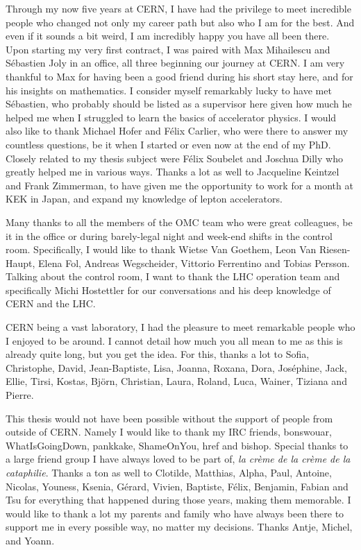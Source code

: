 Through my now five years at CERN, I have had the privilege to meet incredible people who changed
not only my career path but also who I am for the best. And even if it sounds a bit weird, I am
incredibly happy you have all been there.\\
\indent
Upon starting my very first contract, I was paired with Max Mihailescu and Sébastien Joly in an
office, all three beginning our journey at CERN. I am very thankful to Max for having been a good
friend during his short stay here, and for his insights on mathematics. I consider myself
remarkably lucky to have met Sébastien, who probably should be listed as a supervisor here given how 
much he helped me when I struggled to learn the basics of accelerator physics.
I would also like to thank Michael Hofer and Félix Carlier, who were there to answer my countless
questions, be it when I started or even now at the end of my PhD.
Closely related to my thesis subject were Félix Soubelet and Joschua Dilly who greatly helped me in
various ways.
Thanks a lot as well to Jacqueline Keintzel and Frank Zimmerman, to have given me the opportunity to
work for a month at KEK in Japan, and expand my knowledge of lepton accelerators. 

Many thanks to all the members of the OMC team who were great colleagues, be it in the office or
during barely-legal night and week-end shifts in the control room. Specifically, I would like to
thank Wietse Van Goethem, Leon Van Riesen-Haupt, Elena Fol, Andreas Wegscheider, Vittorio Ferrentino
and Tobias Persson. Talking about the control room, I want to thank the LHC operation team and
specifically Michi Hostettler for our conversations and his deep knowledge of CERN and the LHC.

CERN being a vast laboratory, I had the pleasure to meet remarkable people who I enjoyed to be
around. I cannot detail how much you all mean to me as this is already quite long, but you get the 
idea. For this, thanks a lot to Sofia, Christophe, David, Jean-Baptiste, Lisa, Joanna, Roxana, Dora,
Joséphine, Jack, Ellie, Tirsi, Kostas, Björn, Christian, Laura, Roland, Luca, Wainer, Tiziana and
Pierre.

This thesis would not have been possible without the support of people from outside of CERN. Namely
I would like to thank my IRC friends, bonswouar, WhatIsGoingDown, pankkake, ShameOnYou, href and
bishop. Special thanks to a large friend group I have always loved to be part of, \textit{la crème
de la crème de la cataphilie}.
Thanks a ton as well to Clotilde, Matthias, Alpha, Paul, Antoine, Nicolas, Youness, Ksenia, Gérard, Vivien,
Baptiste, Félix, Benjamin, Fabian and Tsu for everything that happened during those years,
making them memorable.
I would like to thank a lot my parents and family who have always been there to support me in every
possible way, no matter my decisions. Thanks Antje, Michel, and Yoann.
